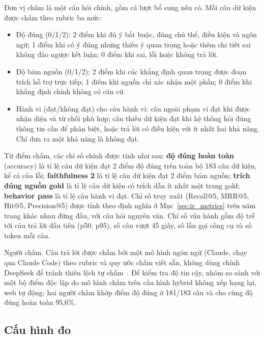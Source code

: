 Đơn vị chấm là một câu hỏi chính, gồm cả lượt bổ sung nếu có. Mỗi câu dữ kiện được chấm theo rubric ba mức:
\begin{itemize}
    \item Độ đúng (0/1/2): 2 điểm khi đủ ý bắt buộc, đúng chủ thể, điều kiện và ngôn ngữ; 1 điểm khi có ý đúng nhưng thiếu ý quan trọng hoặc thêm chi tiết sai không đảo ngược kết luận; 0 điểm khi sai, lỗi hoặc không trả lời.
    \item Độ bám nguồn (0/1/2): 2 điểm khi các khẳng định quan trọng được đoạn trích hỗ trợ trực tiếp; 1 điểm khi nguồn chỉ xác nhận một phần; 0 điểm khi khẳng định chính không có căn cứ.
    \item Hành vi (đạt/không đạt) cho câu hành vi: câu ngoài phạm vi đạt khi được nhận diện và từ chối phù hợp; câu thiếu dữ kiện đạt khi hệ thống hỏi đúng thông tin cần để phân biệt, hoặc trả lời có điều kiện với ít nhất hai khả năng. Chỉ đưa ra một khả năng là không đạt.
\end{itemize}
Từ điểm chấm, các chỉ số chính được tính như sau: \textbf{độ đúng hoàn toàn} (accuracy) là tỉ lệ câu dữ kiện đạt 2 điểm độ đúng trên toàn bộ 183 câu dữ kiện, kể cả câu lỗi; \textbf{faithfulness 2} là tỉ lệ câu dữ kiện đạt 2 điểm bám nguồn; \textbf{trích đúng nguồn gold} là tỉ lệ câu dữ kiện có trích dẫn ít nhất một trang gold; \textbf{behavior pass} là tỉ lệ câu hành vi đạt. Chỉ số truy xuất (Recall@5, MRR@5, Hit@5, Precision@5) được tính theo định nghĩa ở Mục~\ref{sec:ir_metrics} trên năm trang khác nhau đứng đầu, với câu hỏi nguyên văn. Chỉ số vận hành gồm độ trễ tới câu trả lời đầu tiên (p50, p95), số câu vượt 45 giây, số lần gọi công cụ và số token mỗi câu.

Người chấm. Câu trả lời được chấm bởi một mô hình ngôn ngữ (Claude, chạy qua Claude Code) theo rubric và quy ước chấm viết sẵn, không dùng chính DeepSeek để tránh thiên lệch tự chấm~\cite{zheng2023judge}. Để kiểm tra độ tin cậy, nhóm so sánh với một bộ điểm độc lập do mô hình  chấm trên cấu hình hybrid không xếp hạng lại, web tự động: hai người chấm khớp điểm độ đúng ở 181/183 câu và cho cùng độ đúng hoàn toàn 95,6\%.

\subsection{Cấu hình đo}
\label{sec:eval_config}


